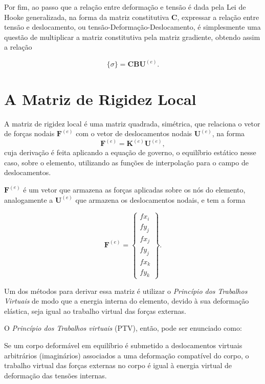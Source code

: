 Por fim, ao passo que a relação entre deformação e tensão é dada pela Lei de Hooke generalizada, na forma da matriz constitutiva $\bm{C}$, expressar a relação entre tensão e deslocamento, ou tensão-Deformação-Deslocamento, é simplesmente uma questão de multiplicar a matriz constitutiva pela matriz gradiente, obtendo assim a relação

\begin{equation}
    \{\sigma\} = \bm{C} \bm{B} \bm{U}^{(e)}.
    \label{eq:relacao_tensao_deslocamento}
\end{equation}


\section{A Matriz de Rigidez Local}

A matriz de rigidez local é uma matriz quadrada, simétrica, que relaciona o vetor de forças nodais $\bm{F}^{(e)}$ com o vetor de deslocamentos nodais $\bm{U}^{(e)}$, na forma
\begin{equation}
    \bm{F}^{(e)} = \bm{K}^{(e)} \bm{U}^{(e)},
\end{equation}
cuja derivação é feita aplicando a equação de governo, o equilíbrio estático nesse caso, sobre o elemento, utilizando as funções de interpolação para o campo de deslocamentos. \cite{LOGAN}

$\bm{F}^{(e)}$ é um vetor que armazena as forças aplicadas sobre os nós do elemento, analogamente a $\bm{U}^{(e)}$ que armazena os deslocamentos nodais, e tem a forma

\begin{equation}
    \bm{F}^{(e)} = \begin{Bmatrix}
        fx_i \\ fy_j \\ fx_j \\ fy_j \\ fx_k \\ fy_k
    \end{Bmatrix}.
\end{equation}

Um dos métodos para derivar essa matriz é utilizar o \emph{Princípio dos Trabalhos Virtuais} de modo que a energia interna do elemento, devido à sua deformação elástica, seja igual ao trabalho virtual das forças externas. \cite{Zin}

O \emph{Princípio dos Trabalhos virtuais} (PTV), então, pode ser enunciado como:

\begin{citacao}
    Se um corpo deformável em equilíbrio é submetido a deslocamentos virtuais arbitrários (imaginários) associados a uma deformação compatível do corpo, o trabalho virtual das forças externas no corpo é igual à energia virtual de deformação das tensões internas. \cite[pág. 876, tradução livre]{LOGAN}
\end{citacao}

